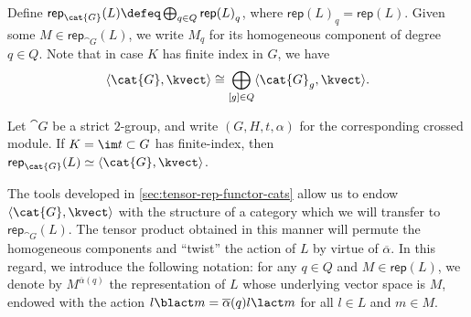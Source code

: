 \begin{notation}
  Define \(\mathsf{rep}_{\cat{G}}(L) \defeq \bigoplus_{q\in Q}{\mathsf{rep}(L)}_{q}\),
  where  \({\mathsf{rep}(L)}_{q} = \mathsf{rep}(L)\).
  Given some \(M\in \mathsf{rep}_{\cat{G}}(L)\), we write \(M_q\) for its homogeneous component of degree \(q\in Q\).
  Note that in case \(K\) has finite index in \(G\), we have
  \[
    \langle \cat{G}, \kvect\rangle \cong \bigoplus_{[g]\in Q}\langle \cat{G}_g, \kvect \rangle.
  \]
\end{notation}

\begin{lemma}\label{lem:structure-of-G-funs}
  Let \(\cat{G}\) be a strict \(2\)\hyp{}group, and write \((G, H, t, \alpha)\) for the corresponding crossed module.
  If \(K=\im t\subset G\) has finite-index,
  then \(\mathsf{rep}_{\cat{G}}(L) \simeq \langle \cat{G}, \kvect\rangle\).
\end{lemma}

The tools developed in \cref{sec:tensor-rep-functor-cats} allow us to endow \(\langle\cat{G}, \kvect\rangle\)
with the structure of a \GV{} category which we will transfer to \(\mathsf{rep}_{\cat{G}}(L)\).
The tensor product obtained in this manner will permute the homogeneous components and ``twist'' the action of \(L\) by virtue of \(\overline{\alpha}\).
In this regard, we introduce the following notation:
for any \(q \in Q\) and \(M \in \mathsf{rep}(L)\),
we denote by \(M^{\overline{\alpha}(q)}\) the representation of \(L\) whose underlying vector space is \(M\), endowed
with the action \(l \blact m = \overline{\alpha}(q)l \lact m\) for all \(l \in L\) and \(m \in M\).


